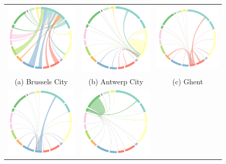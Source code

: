 \documentclass{sig-alternate}
\begin{document}
\begin{figure}[t]
\centering
\begin{tabular}{ccc}
  \includegraphics[width=.33\textwidth]{wd-brussels.pdf}& 
  \includegraphics[width=.33\textwidth]{wd-antwerp.pdf}& 
  \includegraphics[width=.33\textwidth]{wd-gent.pdf}\\
  (a) Brussels City&(b) Antwerp City&(c) Ghent\\[6pt]
  \includegraphics[width=.33\textwidth]{wd-leuven.pdf}& 
  \includegraphics[width=.33\textwidth]{wd-liege.pdf}& 

\end{tabular}
\end{figure}
\end{document}
